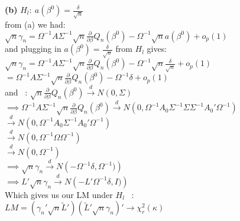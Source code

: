 \documentclass[11pt]{article}
\theoremstyle{definition}
\newcommand*\circled[1]{\tikz[baseline=(char.base)]{
            \node[shape=circle,draw,inner sep=2pt] (char) {#1};}}
\def\indist{\stackrel{d}{\rightarrow}}
\begin{document}
\noindent
\textbf{(b)} $H_{l}: \ a(\beta^{0})=\frac{\delta}{\sqrt{n}}$ \\

from (a) we had: \\

$\sqrt{n}\gamma_{n}=\Omega^{-1}A\Sigma^{-1}\sqrt{n}\frac{\partial}{\partial \beta} Q_{n}(\beta^{0})-\Omega^{-1}\sqrt{n}a(\beta^{0})+o_{p}(1)$\\

and plugging in $a(\beta^{0})=\frac{\delta}{\sqrt{n}}$ from $H_{l}$ gives:\\

$\sqrt{n}\gamma_{n}=\Omega^{-1}A\Sigma^{-1}\sqrt{n}\frac{\partial}{\partial \beta} Q_{n}(\beta^{0})-\Omega^{-1}\sqrt{n}\frac{\delta}{\sqrt{n}}+o_{p}(1)$ \\

\hspace{10.5mm}$=\Omega^{-1}A\Sigma^{-1}\sqrt{n}\frac{\partial}{\partial \beta} Q_{n}(\beta^{0})-\Omega^{-1}\delta+o_{p}(1)$ \\

and \circled{B} \ : $ \sqrt{n}\frac{\partial}{\partial \beta}Q_{n}(\beta^{0}) \indist N(0,\Sigma)$ \\

$\implies \Omega^{-1}A\Sigma^{-1}\sqrt{n}\frac{\partial}{\partial \beta} Q_{n}(\beta^{0}) \indist N\left(0,\Omega^{-1}A_{0}\Sigma^{-1}\Sigma\Sigma^{-1}A_{0}'\Omega^{-1}\right)$ \\

\hspace{49mm}$\indist N\left(0,\Omega^{-1}A_{0}\Sigma^{-1}A_{0}'\Omega^{-1}\right)$ \\

\hspace{49mm}$\indist N\left(0,\Omega^{-1}\Omega\Omega^{-1}\right)$ \\

\hspace{49mm}$\indist N\left(0,\Omega^{-1}\right)$ \\

$\implies \sqrt{n}\gamma_{n} \indist N\left(-\Omega^{-1}\delta,\Omega^{-1})\right)$ \\

$\implies L'\sqrt{n}\gamma_{n} \indist N\left(-L'\Omega^{-1}\delta, I)\right)$ \\

Which gives us our LM under $H_{l}$ \ : \\

$LM=\left(\gamma_{n}'\sqrt{n}\tilde{L}'\right)\left(\tilde{L}'\sqrt{n}\gamma_{n}\right)' \rightarrow \chi_{r}^{2}(\kappa)$ \\
\end{document}
